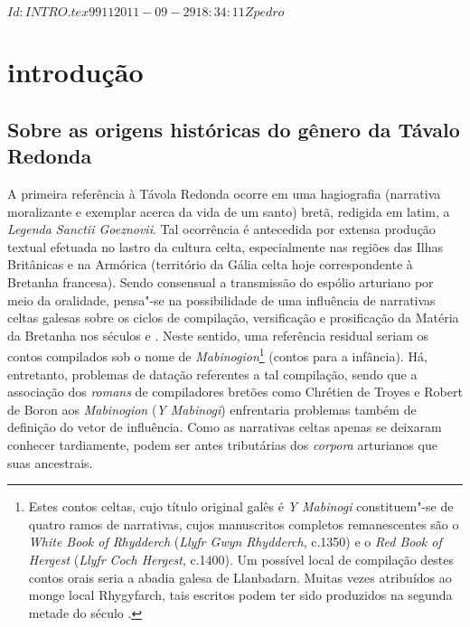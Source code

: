 \SVN $Id: INTRO.tex 9911 2011-09-29 18:34:11Z pedro $
\chapter[Introdução, por Marcus Baccega]{introdução}





\section{Sobre as origens históricas do gênero da Távalo Redonda}

A primeira referência à Távola Redonda ocorre em uma hagiografia (narrativa
moralizante e exemplar acerca da vida de um santo) bretã, redigida em latim, a
\textit{Legenda Sanctii Goeznovii}. Tal ocorrência é antecedida por extensa
produção textual efetuada no lastro da cultura celta, especialmente nas regiões
das Ilhas Britânicas e na Armórica (território da Gália celta hoje
correspondente à Bretanha francesa). Sendo consensual a transmissão do espólio
arturiano por meio da oralidade, pensa"-se na possibilidade de uma influência de
narrativas celtas galesas sobre os ciclos de compilação, versificação e
prosificação da Matéria da Bretanha nos séculos  e . Neste sentido, uma
referência residual seriam os contos compilados sob o nome de
\textit{Mabinogion}\footnote{ Estes contos celtas, cujo título original galês é
	\textit{Y Mabinogi} constituem"-se de quatro ramos de narrativas, cujos
	manuscritos completos remanescentes são o \textit{White Book of Rhydderch}
	(\textit{Llyfr Gwyn Rhydderch}, c.1350) e o \textit{Red Book of Hergest}
	(\textit{Llyfr Coch Hergest}, c.1400). Um possível local de compilação destes
	contos orais seria a abadia galesa de Llanbadarn. Muitas vezes atribuídos ao
	monge local Rhygyfarch, tais escritos podem ter sido produzidos na segunda
	metade do século .} 
(contos para a infância). Há, entretanto, problemas de
datação referentes a tal compilação, sendo que a associação dos
\textit{romans} de compiladores bretões como Chrétien de Troyes e Robert de Boron
aos \textit{Mabinogion} (\textit{Y Mabinogi}) enfrentaria problemas também de
definição do vetor de influência. Como as narrativas celtas apenas se deixaram
conhecer tardiamente, podem ser antes tributárias dos \textit{corpora}
arturianos que suas ancestrais.

